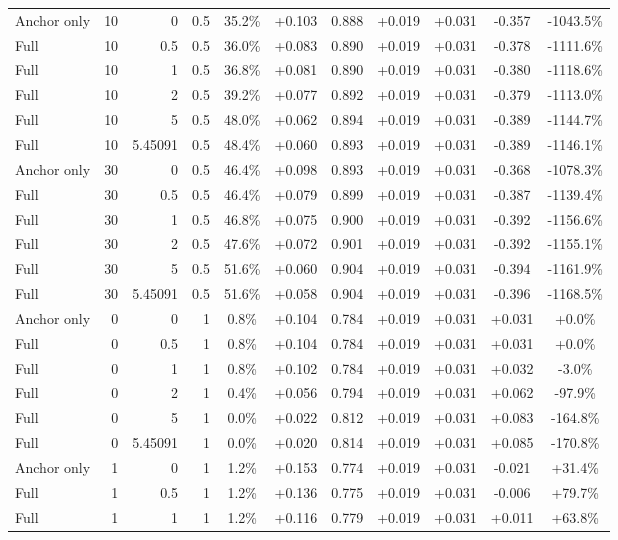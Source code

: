 \begin{table}[htbp]
\begin{tabular}{lrrrccccccc}
Anchor only & 10 & 0 & 0.5 & 35.2\% & +0.103 & 0.888 & +0.019 & +0.031 & -0.357 & -1043.5\% \\
Full & 10 & 0.5 & 0.5 & 36.0\% & +0.083 & 0.890 & +0.019 & +0.031 & -0.378 & -1111.6\% \\
Full & 10 & 1 & 0.5 & 36.8\% & +0.081 & 0.890 & +0.019 & +0.031 & -0.380 & -1118.6\% \\
Full & 10 & 2 & 0.5 & 39.2\% & +0.077 & 0.892 & +0.019 & +0.031 & -0.379 & -1113.0\% \\
Full & 10 & 5 & 0.5 & 48.0\% & +0.062 & 0.894 & +0.019 & +0.031 & -0.389 & -1144.7\% \\
Full & 10 & 5.45091 & 0.5 & 48.4\% & +0.060 & 0.893 & +0.019 & +0.031 & -0.389 & -1146.1\% \\
Anchor only & 30 & 0 & 0.5 & 46.4\% & +0.098 & 0.893 & +0.019 & +0.031 & -0.368 & -1078.3\% \\
Full & 30 & 0.5 & 0.5 & 46.4\% & +0.079 & 0.899 & +0.019 & +0.031 & -0.387 & -1139.4\% \\
Full & 30 & 1 & 0.5 & 46.8\% & +0.075 & 0.900 & +0.019 & +0.031 & -0.392 & -1156.6\% \\
Full & 30 & 2 & 0.5 & 47.6\% & +0.072 & 0.901 & +0.019 & +0.031 & -0.392 & -1155.1\% \\
Full & 30 & 5 & 0.5 & 51.6\% & +0.060 & 0.904 & +0.019 & +0.031 & -0.394 & -1161.9\% \\
Full & 30 & 5.45091 & 0.5 & 51.6\% & +0.058 & 0.904 & +0.019 & +0.031 & -0.396 & -1168.5\% \\
Anchor only & 0 & 0 & 1 & 0.8\% & +0.104 & 0.784 & +0.019 & +0.031 & +0.031 & +0.0\% \\
Full & 0 & 0.5 & 1 & 0.8\% & +0.104 & 0.784 & +0.019 & +0.031 & +0.031 & +0.0\% \\
Full & 0 & 1 & 1 & 0.8\% & +0.102 & 0.784 & +0.019 & +0.031 & +0.032 & -3.0\% \\
Full & 0 & 2 & 1 & 0.4\% & +0.056 & 0.794 & +0.019 & +0.031 & +0.062 & -97.9\% \\
Full & 0 & 5 & 1 & 0.0\% & +0.022 & 0.812 & +0.019 & +0.031 & +0.083 & -164.8\% \\
Full & 0 & 5.45091 & 1 & 0.0\% & +0.020 & 0.814 & +0.019 & +0.031 & +0.085 & -170.8\% \\
Anchor only & 1 & 0 & 1 & 1.2\% & +0.153 & 0.774 & +0.019 & +0.031 & -0.021 & +31.4\% \\
Full & 1 & 0.5 & 1 & 1.2\% & +0.136 & 0.775 & +0.019 & +0.031 & -0.006 & +79.7\% \\
Full & 1 & 1 & 1 & 1.2\% & +0.116 & 0.779 & +0.019 & +0.031 & +0.011 & +63.8\% \\

\end{tabular}
\end{table}

